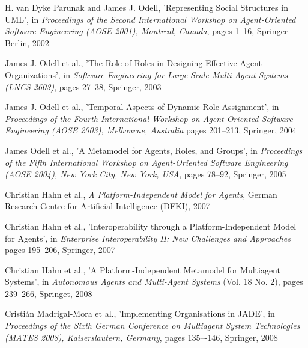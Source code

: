 \begin{thebibliography}{99}
H. van Dyke Parunak and James J. Odell,
'Representing Social Structures in UML',
in \textit{Proceedings of the Second International Workshop on Agent-Oriented Software Engineering (AOSE 2001), Montreal, Canada},
pages 1--16,
Springer Berlin, 2002

James J. Odell et al., %
'The Role of Roles in Designing Effective Agent Organizations',
in \textit{Software Engineering for Large-Scale Multi-Agent Systems (LNCS 2603)},
pages 27--38,
Springer, 2003

James J. Odell et al., %
'Temporal Aspects of Dynamic Role Assignment',
in \textit{Proceedings of the Fourth International Workshop on Agent-Oriented Software Engineering (AOSE 2003), Melbourne, Australia}
pages 201--213,
Springer, 2004

James Odell et al., %
'A Metamodel for Agents, Roles, and Groups',
in \textit{Proceedings of the Fifth International Workshop on Agent-Oriented Software Engineering (AOSE 2004), New York City, New York, USA},
pages 78--92,
Springer, 2005


Christian Hahn et al., %
\textit{A Platform-Independent Model for Agents},
German Research Centre for Artificial Intelligence (DFKI), 2007

Christian Hahn et al., %
'Interoperability through a Platform-Independent Model for Agents',
in \textit{Enterprise Interoperability II: New Challenges and Approaches}
pages 195--206,
Springer, 2007

Christian Hahn et al., %
'A Platform-Independent Metamodel for Multiagent Systems',
in \textit{Autonomous Agents and Multi-Agent Systems} (Vol. 18 No. 2),
pages 239--266,
Springet, 2008

Cristián Madrigal-Mora et al., %
'Implementing Organisations in JADE',
in \textit{Proceedings of the Sixth German Conference on Multiagent System Technologies (MATES 2008), Kaiserslautern, Germany},
pages 135–-146,
Springer, 2008


\end{thebibliography}

